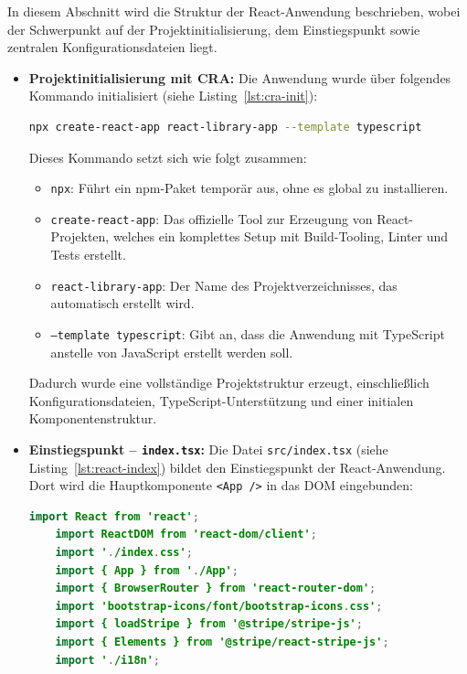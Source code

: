 \noindent In diesem Abschnitt wird die Struktur der React-Anwendung beschrieben, wobei der Schwerpunkt auf der Projektinitialisierung, dem Einstiegspunkt sowie zentralen Konfigurationsdateien liegt.

\begin{itemize}
	\item \textbf{Projektinitialisierung mit CRA:} Die Anwendung wurde über folgendes Kommando initialisiert (siehe Listing~\ref{lst:cra-init}):
	\begin{lstlisting}[language=bash, caption=Projektinitialisierung mit Create React App, label=lst:cra-init]
		npx create-react-app react-library-app --template typescript
	\end{lstlisting}

Dieses Kommando setzt sich wie folgt zusammen:

\begin{itemize}
	\item \texttt{npx}: Führt ein npm-Paket temporär aus, ohne es global zu installieren.
	\item \texttt{create-react-app}: Das offizielle Tool zur Erzeugung von React-Projekten, welches ein komplettes Setup mit Build-Tooling, Linter und Tests erstellt.
	\item \texttt{react-library-app}: Der Name des Projektverzeichnisses, das automatisch erstellt wird.
	\item \texttt{--template typescript}: Gibt an, dass die Anwendung mit TypeScript anstelle von JavaScript erstellt werden soll.
\end{itemize}

	Dadurch wurde eine vollständige Projektstruktur erzeugt, einschließlich Konfigurationsdateien, TypeScript-Unterstützung und einer initialen Komponentenstruktur.
	
	\item \textbf{Einstiegspunkt – \texttt{index.tsx}:} Die Datei \texttt{src/index.tsx} (siehe Listing~\ref{lst:react-index}) bildet den Einstiegspunkt der React-Anwendung. Dort wird die Hauptkomponente \texttt{<App />} in das DOM eingebunden:
	
	\begin{lstlisting}[language=Java, caption=Einstiegspunkt der React-Anwendung, label=lst:react-index, breaklines=true]
	import React from 'react';
	import ReactDOM from 'react-dom/client';
	import './index.css';
	import { App } from './App';
	import { BrowserRouter } from 'react-router-dom';
	import 'bootstrap-icons/font/bootstrap-icons.css';
	import { loadStripe } from '@stripe/stripe-js';
	import { Elements } from '@stripe/react-stripe-js';
	import './i18n';
	

\end{lstlisting}
\end{itemize}
